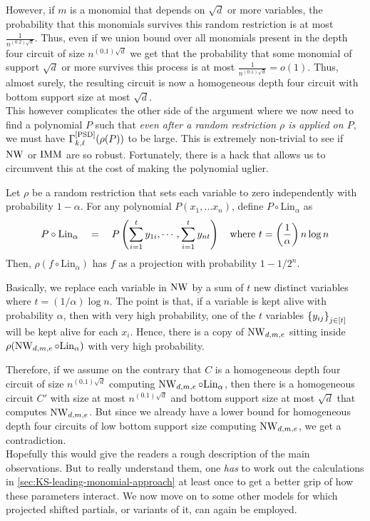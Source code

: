 However, if $m$ is a monomial that depends on $\sqrt{d}$ or more variables, the probability that this monomials survives this random restriction is at most $\frac{1}{n^{(0.2) \sqrt{d}}}$. Thus, even if we union bound over all monomials present in the depth four circuit of size $n^{(0.1)\sqrt{d}}$ we get
that the probability that some monomial of support $\sqrt{d}$ or more survives this process is at most $\frac{1}{n^{(0.1)\sqrt{d}}} = o(1)$. Thus, almost surely, the resulting circuit is now a homogeneous depth four circuit with bottom support size at most $\sqrt{d}$. \\

This however complicates the other side of the argument where we now need to find a polynomial $P$ such that \emph{even after a random restriction $\rho$ is applied on $P$}, we must have $\Gamma^{\mathrm{[PSD]}}_{k,\ell}(\rho(P))$ to be large. This is extremely non-trivial to see if $\operatorname{\mathrm{NW}}$ or $\operatorname{\mathrm{IMM}}$ are so robust. Fortunately, there is a hack that allows us to circumvent this at the cost of making the polynomial uglier. 

\begin{lemma*}
Let $\rho$ be a random restriction that sets each variable to zero independently with probability $1 - \alpha$. 
For any polynomial $P(x_1,\dots x_n)$, define $P \circ \mathrm{Lin}_\alpha$ as
\[
P \circ \mathrm{Lin}_\alpha \quad = \quad P\left(\sum_{i=1}^t y_{1i}, \cdots, \sum_{i=1}^t y_{nt}\right)\quad \text{where $t = \left(\frac{1}{\alpha}\right) n \log n$}
\]
Then, $\rho(f \circ \mathrm{Lin}_\alpha)$ has $f$ as a projection with probability $1 - 1/2^{n}$. 
\end{lemma*}

Basically, we replace each variable in $\operatorname{\mathrm{NW}}$ by a sum of $t$ new distinct variables where $t = (1/\alpha) \log n$. The point is that, if a variable is kept alive with probability $\alpha$, then with very high probability, one of the $t$ variables $\left\{y_{ij}\right\}_{j\in [t]}$ will be kept alive for each $x_i$. Hence, there is a copy of $\operatorname{\mathrm{NW}}_{d,m,e}$ sitting inside $\rho(\operatorname{\mathrm{NW}}_{d,m,e} \circ \mathrm{Lin}_\alpha)$ with very high probability. 

Therefore, if we assume on the contrary that $C$ is a homogeneous depth four circuit of size $n^{(0.1)\sqrt{d}}$ computing $\operatorname{\mathrm{NW}}_{d,m,e} \circ \mathrm{Lin}_\alpha$, then there is a homogeneous circuit $C'$ with size at most $n^{(0.1)\sqrt{d}}$ and bottom support size at most $\sqrt{d}$ that computes $\operatorname{\mathrm{NW}}_{d,m,e}$. But since we already have a lower bound for homogeneous depth four circuits of low bottom support size computing $\operatorname{\mathrm{NW}}_{d,m,e}$, we get a contradiction. \\

Hopefully this would give the readers a rough description of the main observations. But to really understand them, one \emph{has} to work out the calculations in \autoref{sec:KS-leading-monomial-approach} at least once to get a better grip of how these parameters interact. We now move on to some other models for which projected shifted partials, or variants of it, can again be employed. 


